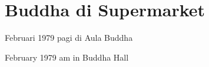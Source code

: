 \chapter{Buddha di Supermarket} %

 Februari 1979 pagi di Aula Buddha

 February 1979 am in Buddha Hall
